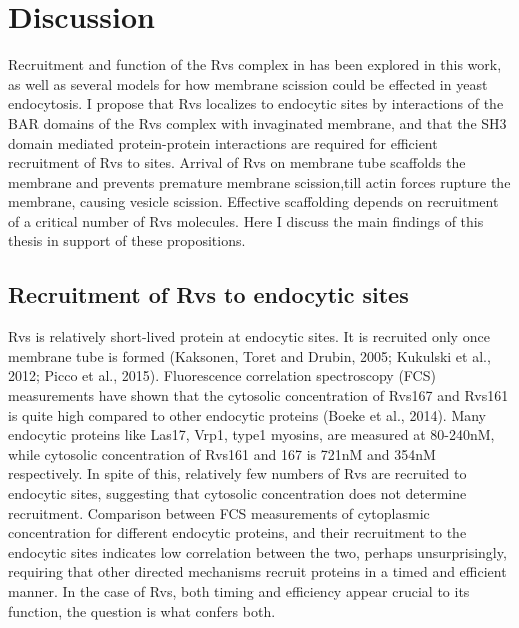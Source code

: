 
\chapter{Discussion}    
\label{Ch:Discussion}

Recruitment and function of the Rvs complex in has been explored in this work, as well as several models for how membrane scission could be effected in yeast endocytosis. 
I propose that Rvs localizes to endocytic sites by interactions of the BAR domains of the Rvs complex with invaginated membrane, and that the SH3 domain mediated protein-protein interactions are required for efficient recruitment of Rvs to sites. Arrival of Rvs on membrane tube scaffolds the membrane and prevents premature membrane scission,till actin forces rupture the membrane, causing vesicle scission. Effective scaffolding depends on recruitment of a critical number of Rvs molecules. Here I discuss the main findings of this thesis in support of these propositions.



\section{Recruitment of Rvs to endocytic sites}
Rvs is relatively short-lived protein at endocytic sites. It is recruited only once membrane tube is formed (Kaksonen, Toret and Drubin, 2005; Kukulski et al., 2012; Picco et al., 2015). Fluorescence correlation spectroscopy (FCS) measurements have shown that the cytosolic concentration of Rvs167 and Rvs161 is quite high compared to other endocytic proteins (Boeke et al., 2014). Many endocytic proteins like Las17, Vrp1, type1 myosins, are measured at 80-240nM, while cytosolic concentration of Rvs161 and 167 is 721nM and 354nM respectively. In spite of this, relatively few numbers of Rvs are recruited to endocytic sites, suggesting that cytosolic concentration does not determine recruitment. Comparison between FCS measurements of cytoplasmic concentration for different endocytic proteins, and their recruitment to the endocytic sites indicates low correlation between the two, perhaps unsurprisingly, requiring that other directed mechanisms recruit proteins in a timed and efficient manner. In the case of Rvs, both timing and efficiency appear crucial to its function, the question is what confers both. 




